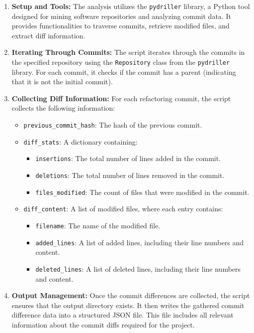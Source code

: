 \documentclass[sigconf]{acmart}
\begin{document}
\begin{enumerate}
    \item \textbf{Setup and Tools:} The analysis utilizes the \texttt{pydriller} library, a Python tool designed for mining software repositories and analyzing commit data. It provides functionalities to traverse commits, retrieve modified files, and extract diff information.

    \item \textbf{Iterating Through Commits:} The script iterates through the commits in the specified repository using the \texttt{Repository} class from the \texttt{pydriller} library. For each commit, it checks if the commit has a parent (indicating that it is not the initial commit).

    \item \textbf{Collecting Diff Information:} For each refactoring commit, the script collects the following information:
    \begin{itemize}
        \item \texttt{previous\_commit\_hash}: The hash of the previous commit.
        \item \texttt{diff\_stats}: A dictionary containing:
        \begin{itemize}
            \item \texttt{insertions}: The total number of lines added in the commit.
            \item \texttt{deletions}: The total number of lines removed in the commit.
            \item \texttt{files\_modified}: The count of files that were modified in the commit.
        \end{itemize}
        \item \texttt{diff\_content}: A list of modified files, where each entry contains:
        \begin{itemize}
            \item \texttt{filename}: The name of the modified file.
            \item \texttt{added\_lines}: A list of added lines, including their line numbers and content.
            \item \texttt{deleted\_lines}: A list of deleted lines, including their line numbers and content.
        \end{itemize}
    \end{itemize}

    \item \textbf{Output Management:} Once the commit differences are collected, the script ensures that the output directory exists. It then writes the gathered commit difference data into a structured JSON file. This file includes all relevant information about the commit diffs required for the project.
\end{enumerate}
\end{document}
